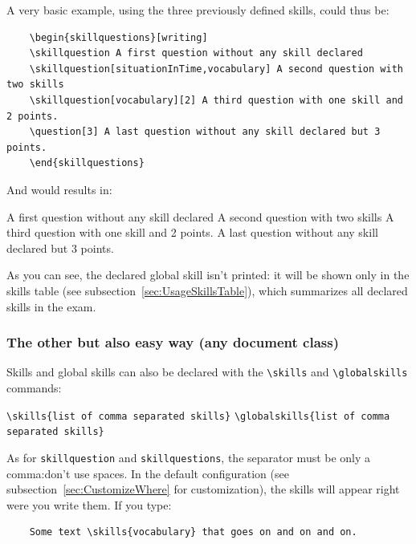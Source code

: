 \documentclass[12pt]{exam}
\begin{document}
A very basic example, using the three previously defined skills, could thus be:

\begin{verbatim}
	\begin{skillquestions}[writing]
	\skillquestion A first question without any skill declared
	\skillquestion[situationInTime,vocabulary] A second question with two skills
	\skillquestion[vocabulary][2] A third question with one skill and 2 points.
	\question[3] A last question without any skill declared but 3 points.
	\end{skillquestions}
\end{verbatim}

And would results in:
	\begin{skillquestions}[writing]
	\skillquestion A first question without any skill declared
	 A second question with two skills
	\skillquestion[vocabulary][2] A third question with one skill and 2 points.
	\question[3] A last question without any skill declared but 3 points.
\end{skillquestions}

\bigskip

As you can see, the declared global skill isn't printed: it will be shown only in the skills table (see subsection~\ref{sec:UsageSkillsTable}), which summarizes all declared skills in the exam.

\subsubsection{The other but also easy way (any document class)}
\label{sec:UsageDeclaringSkillsAnyClass}

Skills and global skills can also be declared with the \verb|\skills| and \verb|\globalskills| commands:

\begin{center}
	\verb|\skills{list of comma separated skills}|
	\verb|\globalskills{list of comma separated skills}|
\end{center}

As for \verb|skillquestion| and \verb|skillquestions|, the separator must be only a comma:don't
use spaces. In the default configuration (see subsection~\ref{sec:CustomizeWhere} for customization), the skills will appear right
were you write them. If you type:

\begin{verbatim}
	Some text \skills{vocabulary} that goes on and on and on.
\end{verbatim}
\end{document}
